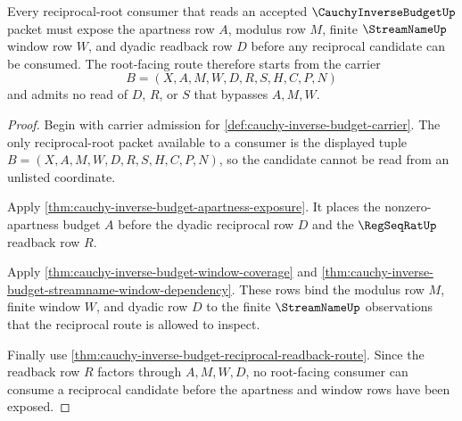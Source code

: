 \begin{theorem}
\label{thm:cauchy-inverse-budget-root-apartness-window-obligation}
Every reciprocal-root consumer that reads an accepted $\CauchyInverseBudgetUp$ packet must expose the apartness row $A$, modulus row $M$, finite $\StreamNameUp$ window row $W$, and dyadic readback row $D$ before any reciprocal candidate can be consumed. The root-facing route therefore starts from the carrier
$$
B=(X,A,M,W,D,R,S,H,C,P,N)
$$
and admits no read of $D$, $R$, or $S$ that bypasses $A,M,W$.
\end{theorem}
\begin{proof}
Begin with carrier admission for \autoref{def:cauchy-inverse-budget-carrier}. The only reciprocal-root packet available to a consumer is the displayed tuple $B=(X,A,M,W,D,R,S,H,C,P,N)$, so the candidate cannot be read from an unlisted coordinate.

Apply \autoref{thm:cauchy-inverse-budget-apartness-exposure}. It places the nonzero-apartness budget $A$ before the dyadic reciprocal row $D$ and the $\RegSeqRatUp$ readback row $R$.

Apply \autoref{thm:cauchy-inverse-budget-window-coverage} and \autoref{thm:cauchy-inverse-budget-streamname-window-dependency}. These rows bind the modulus row $M$, finite window $W$, and dyadic row $D$ to the finite $\StreamNameUp$ observations that the reciprocal route is allowed to inspect.

Finally use \autoref{thm:cauchy-inverse-budget-reciprocal-readback-route}. Since the readback row $R$ factors through $A,M,W,D$, no root-facing consumer can consume a reciprocal candidate before the apartness and window rows have been exposed.
\end{proof}

